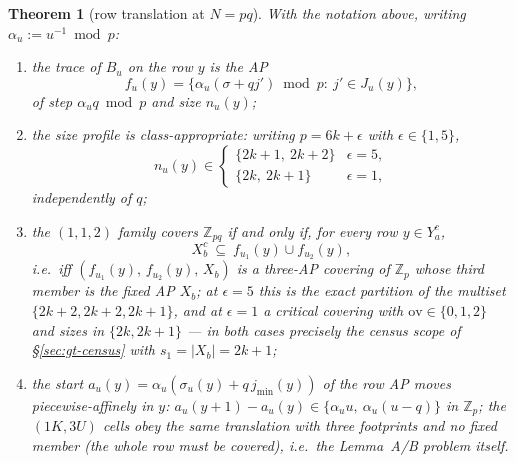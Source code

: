 \documentclass[11pt,a4paper]{article}
\numberwithin{equation}{section}
\theoremstyle{plain}
\theoremstyle{plain}
\newtheorem{theorem}{Theorem}[section]
\theoremstyle{definition}
\theoremstyle{remark}
\newcommand{\Z}{\mathbb{Z}}
\begin{document}
\begin{theorem}[row translation at $N=pq$]\label{thm:R}
With the notation above, writing $\alpha_u:=u^{-1}\bmod p$:
\begin{enumerate}[leftmargin=1.9em,itemsep=2pt]
\item[\textup{(i)}] the trace of $B_u$ on the row $y$ is the AP
\[
f_u(y)=\{\alpha_u(\sigma+qj')\bmod p:\ j'\in J_u(y)\},
\]
of step $\alpha_u q\bmod p$ and size $n_u(y)$;
\item[\textup{(ii)}] the size profile is class-appropriate: writing
$p=6k+\epsilon$ with $\epsilon\in\{1,5\}$,
\[
n_u(y)\in
\begin{cases}
\{2k+1,\ 2k+2\}&\epsilon=5,\\
\{2k,\ 2k+1\}&\epsilon=1,
\end{cases}
\]
independently of $q$;
\item[\textup{(iii)}] the $(1,1,2)$ family covers $\Z_{pq}$ if and only if,
for every row $y\in Y_a^{c}$,
\[
X_b^{c}\ \subseteq\ f_{u_1}(y)\cup f_{u_2}(y),
\]
i.e.\ iff $(f_{u_1}(y),\,f_{u_2}(y),\,X_b)$ is a three-AP covering of
$\Z_p$ whose third member is the \emph{fixed} AP $X_b$; at $\epsilon=5$ this
is the exact partition of the multiset $\{2k{+}2,2k{+}2,2k{+}1\}$, and at
$\epsilon=1$ a critical covering with $\mathrm{ov}\in\{0,1,2\}$ and sizes in
$\{2k,2k{+}1\}$ --- in both cases precisely the census scope of
\S\ref{sec:gt-census} with $s_1=|X_b|=2k+1$;
\item[\textup{(iv)}] the start $a_u(y)=\alpha_u(\sigma_u(y)+q\,j_{\min}(y))$
of the row AP moves \emph{piecewise-affinely} in $y$:
$a_u(y{+}1)-a_u(y)\in\{\alpha_u u,\ \alpha_u(u-q)\}$ in $\Z_p$; the
$(1K,3U)$ cells obey the same translation with three footprints and no fixed
member (the whole row must be covered), i.e.\ the Lemma~A/B problem itself.
\end{enumerate}
\end{theorem}
\end{document}
